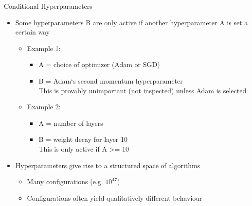 \begin{frame}[c]{Conditional Hyperparameters}
\begin{itemize}
	\item Some hyperparameters B are only active if another
	hyperparameter A is set a certain way
	\begin{itemize}
		\item Example 1:
		\begin{itemize}
			\item A = choice of optimizer (Adam or SGD)
			\item B = Adam‘s second momentum hyperparameter\\
			This is provably unimportant (not inspected) unless Adam is selected
		\end{itemize}
		\item Example 2:
		\begin{itemize}
			\item A = number of layers
			\item B = weight decay for layer 10\\
			This is only active if A >= 10
		\end{itemize}
	\end{itemize}
	\item Hyperparameters give rise to a \alert{structured space of algorithms}
	\begin{itemize}
		\item Many \alert{configurations} (e.g. $10^{47}$)
		\item Configurations often yield qualitatively different behaviour
	\end{itemize}
\end{itemize}
\end{frame}
